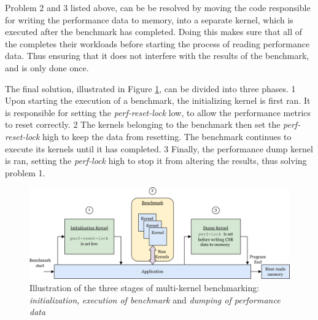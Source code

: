 Problem 2 and 3 listed above, can be be resolved by moving the code responsible for writing the performance data to memory, into a separate kernel, which is executed after the benchmark has completed. Doing this makes sure that all of the  completes their workloads before starting the process of reading performance data. Thus ensuring that it does not interfere with the results of the benchmark, and is only done once.

The final solution, illustrated in Figure \ref{fig:init_run_dump}, can be divided into three phases. \textcircled{\small{1}} Upon starting the execution of a benchmark, the initializing kernel is first ran. It is responsible for setting the \textit{perf-reset-lock} low, to allow the performance metrics to reset correctly. \textcircled{\small{2}} The kernels belonging to the benchmark then set the \textit{perf-reset-lock} high to keep the data from resetting. The benchmark continues to execute its kernels until it has completed. \textcircled{\small{3}} Finally, the performance dump kernel is ran, setting the \textit{perf-lock} high to stop it from altering the results, thus solving problem 1. 



\begin{figure}
    \centering
    \includegraphics[width=\textwidth]{figures/perf-kernels.png}
    \caption[Illustration of the three stages of multi-kernel benchmarking.]{Illustration of the three stages of multi-kernel benchmarking: \textit{initialization}, \textit{execution of benchmark} and \textit{dumping of performance data}}
    \label{fig:init_run_dump}
\end{figure}

